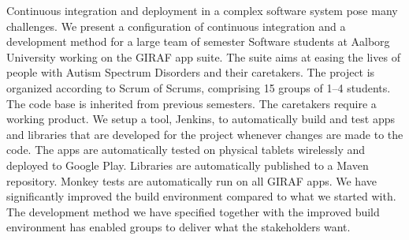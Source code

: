 Continuous integration and deployment in a complex software system pose many challenges. We present a configuration of continuous integration and a development method for a large team of  semester Software students at Aalborg University working on the GIRAF app suite. The suite aims at easing the lives of people with Autism Spectrum Disorders and their caretakers. The project is organized according to Scrum of Scrums, comprising 15 groups of 1--4 students. The code base is inherited from previous semesters. The caretakers require a working product. We setup a tool, Jenkins, to automatically build and test apps and libraries that are developed for the project whenever changes are made to the code. The apps are automatically tested on physical tablets wirelessly and deployed to Google Play. Libraries are automatically published to a Maven repository. Monkey tests are automatically run on all GIRAF apps. We have significantly improved the build environment compared to what we started with. The development method we have specified together with the improved build environment has enabled groups to deliver what the stakeholders want.